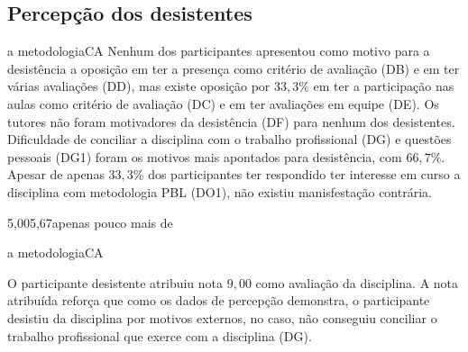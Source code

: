 \subsection{Percepção dos desistentes}
%
{a metodologia}{CA}
Nenhum dos participantes apresentou como motivo para a desistência a
oposição em ter a presença como critério de avaliação (DB) e
em ter várias avaliações (DD), mas existe oposição por $33,3\%$
em ter a participação nas aulas como critério de avaliação (DC) e em ter
avaliações em equipe (DE).
Os tutores não foram motivadores da desistência (DF) para nenhum
dos desistentes.
Dificuldade de conciliar a disciplina com
o trabalho profissional (DG) e questões pessoais (DG1)
foram os motivos mais apontados para desistência,
com $66,7\%$.
Apesar de apenas $33,3\%$ dos participantes ter respondido ter interesse
em curso a disciplina com metodologia PBL (DO1), não existiu
manisfestação contrária.

{5,00}{5,67}{apenas pouco mais de}

%
{a metodologia}{CA}



O participante desistente atribuiu nota $9,00$ como avaliação da
disciplina.
A nota atribuída reforça que como os dados de percepção demonstra,
o participante desistiu da disciplina por motivos externos, no caso,
não conseguiu conciliar o trabalho profissional que exerce com
a disciplina (DG).
